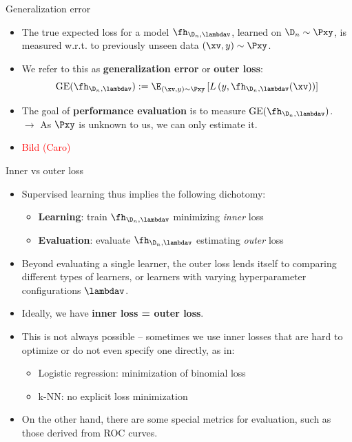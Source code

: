 \documentclass[11pt,compress,t,notes=noshow, xcolor=table]{beamer}
\begin{document}
\begin{vbframe}{Generalization error}

\begin{itemize}
  \item The true expected loss for a model $\fh_{\D_n, \lambdav}$, learned on 
  $\D_n \sim \Pxy$, is measured w.r.t. to previously 
  unseen data $(\xv, y) \sim \Pxy$.
  \item We refer to this as \textbf{generalization error} or \textbf{outer 
  loss}:
  $$\mathrm{GE}(\fh_{\D_n, \lambdav}) := \E_{(\xv, y) \sim \Pxy}\left[ 
  L\left(y, \fh_{\D_n, \lambdav}(\xv)\right) \right]$$
  \item The goal of \textbf{performance evaluation} is to measure 
  $\mathrm{GE}(\fh_{\D_n, \lambdav})$. \\
  $\rightarrow$ As $\Pxy$ is unknown to us, we can only estimate it.
  \item \textcolor{red}{Bild (Caro)}
\end{itemize}

\end{vbframe}


\begin{vbframe}{Inner vs outer loss}

\begin{itemize}
  \item Supervised learning thus implies the following dichotomy:
  \begin{itemize}
    \item \textbf{Learning}: train $\fh_{\D_n, \lambdav}$ minimizing 
    \textit{inner} loss
    \item \textbf{Evaluation}: evaluate $\fh_{\D_n, \lambdav}$ estimating
    \textit{outer} loss
  \end{itemize}
  \item Beyond evaluating a single learner, the outer loss lends itself to
  comparing different types of learners, or learners with varying hyperparameter
  configurations $\lambdav$.
\end{itemize}

\lz

\begin{itemize}
  \item Ideally, we have \textbf{inner loss = outer loss}.
  \item This is not always possible -- sometimes we use inner losses that are 
  hard to optimize or do not even specify one directly, as in:
  \begin{itemize}
    \item Logistic regression: minimization of binomial loss
    \item k-NN: no explicit loss minimization
  \end{itemize}
  \item On the other hand, there are some special metrics for evaluation,
  such as those derived from ROC curves.
\end{itemize}

\end{vbframe}
\end{document}
